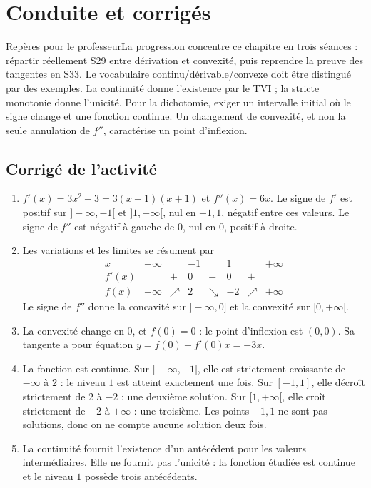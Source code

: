 \ifprof\clearpage\section{Conduite et corrigés}\begin{profbox}{Repères pour le professeur}La progression concentre ce chapitre en trois séances : répartir réellement S29 entre dérivation et convexité, puis reprendre la preuve des tangentes en S33. Le vocabulaire continu/dérivable/convexe doit être distingué par des exemples. La continuité donne l'existence par le TVI ; la stricte monotonie donne l'unicité. Pour la dichotomie, exiger un intervalle initial où le signe change et une fonction continue. Un changement de convexité, et non la seule annulation de $f''$, caractérise un point d'inflexion.\end{profbox}

\subsection{Corrigé de l'activité}\begin{enumerate}
\item $f'(x)=3x^2-3=3(x-1)(x+1)$ et $f''(x)=6x$. Le signe de $f'$ est positif sur $]-\infty,-1[$ et $]1,+\infty[$, nul en $-1,1$, négatif entre ces valeurs. Le signe de $f''$ est négatif à gauche de $0$, nul en $0$, positif à droite.
\item Les variations et les limites se résument par
\[\begin{array}{c|ccccccc}x&-\infty&&-1&&1&&+\infty\\\hline f'(x)&&+&0&-&0&+&\\\hline f(x)&-\infty&\nearrow&2&\searrow&-2&\nearrow&+\infty\end{array}\]
Le signe de $f''$ donne la concavité sur $]-\infty,0]$ et la convexité sur $[0,+\infty[$.
\item La convexité change en $0$, et $f(0)=0$ : le point d'inflexion est $(0,0)$. Sa tangente a pour équation $y=f(0)+f'(0)x=-3x$.
\item La fonction est continue. Sur $]-\infty,-1]$, elle est strictement croissante de $-\infty$ à $2$ : le niveau $1$ est atteint exactement une fois. Sur $[-1,1]$, elle décroît strictement de $2$ à $-2$ : une deuxième solution. Sur $[1,+\infty[$, elle croît strictement de $-2$ à $+\infty$ : une troisième. Les points $-1,1$ ne sont pas solutions, donc on ne compte aucune solution deux fois.
\item La continuité fournit l'existence d'un antécédent pour les valeurs intermédiaires. Elle ne fournit pas l'unicité : la fonction étudiée est continue et le niveau $1$ possède trois antécédents.
\end{enumerate}

